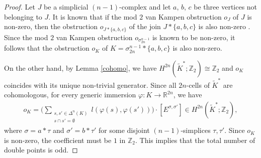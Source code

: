 \documentclass{amsart}
\theoremstyle{definition}
\theoremstyle{remark}
\numberwithin{equation}{section}
\begin{document}
\begin{proof}
Let $J$ be a simplicial $(n-1)$-complex and let $a$, $b$, $c$ be three vertices not belonging to $J$. It is known that if the mod $2$ van Kampen obstruction $o_J$ of $J$ is non-zero, then the obstruction $o_{J*\{a,b,c\}}$ of the join $J*\{a,b,c\}$ is also non-zero \cite{Pa20}. Since the mod $2$ van Kampen obstruction $o_{\sigma_{2n}^{n-1}}$ is known to be non-zero, it follows that the obstruction $o_K$ of $K=\sigma_{2n}^{n-1}*\{a,b,c\}$ is also non-zero. 

On the other hand, by Lemma \ref{cohomo}, we have $H^{2n}(\widetilde{K}^*;\mathbb{Z}_2)\cong\mathbb{Z}_2$ and $o_K$ coincides with its unique non-trivial generator. Since all $2n$-cells of $\widetilde{K}^*$ are cohomologous, for every generic immersion $\varphi \colon K \to \mathbb{R}^{2n}$, we have
\begin{eqnarray*}
o_K = \bigg( \sum_{\substack{s,s'\in\varDelta^{n}(K)\\ s\cap s'=\emptyset}} l(\varphi(s),\varphi(s')) \bigg) \cdot [E^{\sigma,\sigma'}] \in H^{2n}(\widetilde{K}^*;\mathbb{Z}_2),
\end{eqnarray*}
where $\sigma = a*\tau$ and $\sigma' = b*\tau'$ for some disjoint $(n-1)$-simplices $\tau,\tau'$. Since $o_K$ is non-zero, the coefficient must be $1$ in $\mathbb{Z}_2$. This implies that the total number of double points is odd.
\end{proof}
\end{document}
